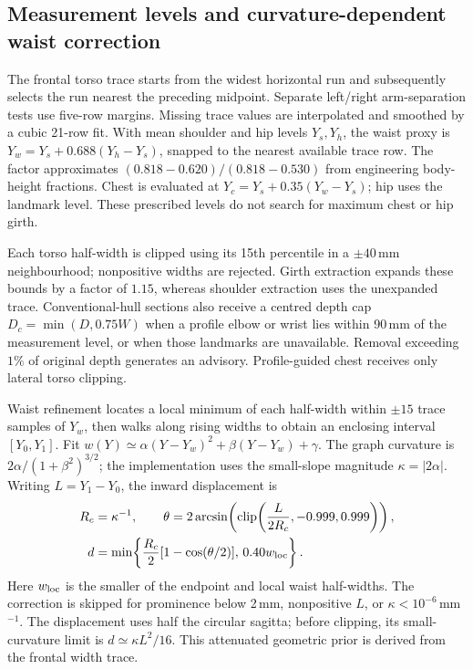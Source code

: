 \documentclass[11pt,a4paper]{article}
\newcommand{\clip}{\operatorname{clip}}
\begin{document}
\subsection{Measurement levels and curvature-dependent waist correction}
The frontal torso trace starts from the widest horizontal run and subsequently selects the run nearest the preceding midpoint. Separate left/right arm-separation tests use five-row margins. Missing trace values are interpolated and smoothed by a cubic 21-row fit. With mean shoulder and hip levels $Y_s,Y_h$, the waist proxy is $Y_w=Y_s+0.688(Y_h-Y_s)$, snapped to the nearest available trace row. The factor approximates $(0.818-0.620)/(0.818-0.530)$ from engineering body-height fractions. Chest is evaluated at $Y_c=Y_s+0.35(Y_w-Y_s)$; hip uses the landmark level. These prescribed levels do not search for maximum chest or hip girth.

Each torso half-width is clipped using its 15th percentile in a $\pm40$\,mm neighbourhood; nonpositive widths are rejected. Girth extraction expands these bounds by a factor of $1.15$, whereas shoulder extraction uses the unexpanded trace. Conventional-hull sections also receive a centred depth cap $D_c=\min(D,0.75W)$ when a profile elbow or wrist lies within 90\,mm of the measurement level, or when those landmarks are unavailable. Removal exceeding $1\%$ of original depth generates an advisory. Profile-guided chest receives only lateral torso clipping.

Waist refinement locates a local minimum of each half-width within $\pm15$ trace samples of $Y_w$, then walks along rising widths to obtain an enclosing interval $[Y_0,Y_1]$. Fit $w(Y)\simeq\alpha(Y-Y_w)^2+\beta(Y-Y_w)+\gamma$. The graph curvature is $2\alpha/(1+\beta^2)^{3/2}$; the implementation uses the small-slope magnitude $\kappa=|2\alpha|$. Writing $L=Y_1-Y_0$, the inward displacement is
\begin{equation}
 \begin{aligned}
 R_c&=\kappa^{-1},\qquad
 \theta=2\arcsin\!\left(\clip\!\left(\frac{L}{2R_c},-0.999,0.999\right)\right),\\
 d&=\min\!\left\{\frac{R_c}{2}[1-\cos(\theta/2)],\,0.40w_{\rm loc}\right\}.
 \end{aligned}
 \label{eq:waist}
\end{equation}
Here $w_{\rm loc}$ is the smaller of the endpoint and local waist half-widths. The correction is skipped for prominence below 2\,mm, nonpositive $L$, or $\kappa<10^{-6}$\,mm$^{-1}$. The displacement uses half the circular sagitta; before clipping, its small-curvature limit is $d\simeq\kappa L^2/16$. This attenuated geometric prior is derived from the frontal width trace.
\end{document}
